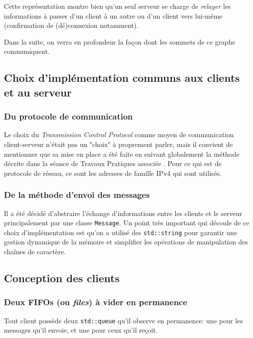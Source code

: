 \documentclass{article}
\begin{document}
\noindent Cette représentation montre bien qu'un seul serveur se charge de \textit{relayer} les informations à passer d'un client à un autre ou d'un client vers lui-même (confirmation de (dé)connexion notamment).

\noindent Dans la suite, on verra en profondeur la façon dont les sommets de ce graphe communiquent.

\subsection{Choix d'implémentation communs aux clients et au serveur}

\subsubsection{Du protocole de communication}
Le choix du \textit{Transmission Control Protocol} \cite{TCP-IP} comme moyen de communication client-serveur n'était pas un "choix" à proprement parler, mais il convient de mentionner que sa mise en place a été faite en suivant globalement la méthode décrite dans la séance de Travaux Pratiques associée \cite{TP_OS}. Pour ce qui est de protocole de réseau, ce sont les adresses de famille IPv4 qui sont utilisés.

\subsubsection{De la méthode d'envoi des messages}
\noindent Il a été décidé d'abstraire l'échange d'informations entre les clients et le serveur principalement par une classe \texttt{Message}. Un point très important qui découle de ce choix d'implémentation est qu'on a utilisé des \texttt{std::string} \cite{std::string} pour garantir une gestion dynamique de la mémoire et simplifier les opérations de manipulation des chaînes de caractère.

\subsection{Conception des clients}

\subsubsection{Deux FIFOs (ou \textit{files}) à vider en permanence}
\noindent Tout client possède deux \texttt{std::queue} \cite{std::queue} qu'il observe en permanence: une pour les messages qu'il envoie, et une pour ceux qu'il reçoit.
\end{document}
